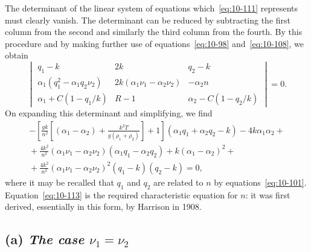 The determinant of the linear system of equations which~\eqref{eq:10-111} represents must clearly vanish. The determinant can be reduced by subtracting the first column from the second and similarly the third column from the fourth. By this procedure and by making further use of equations~\eqref{eq:10-98} and~\eqref{eq:10-108}, we obtain
\begin{equation}
\label{eq:10-112}
\begin{vmatrix}
q_1-k & 2k & q_2-k \\
\alpha_1(q_1^2-\alpha_1q_2\nu_2) & 2k(\alpha_1\nu_1-\alpha_2\nu_2) & -\alpha_2 n \\
\alpha_1+C(1-q_1/k) & R-1 & \alpha_2-C(1-q_2/k)
\end{vmatrix} = 0.
\end{equation}
On expanding this determinant and simplifying, we find
\begin{align}
\label{eq:10-113}
-\left[\frac{gk}{n^2}\!\left[(\alpha_1-\alpha_2)+\frac{k^2T}{g(\rho_1+\rho_2)}\right]+1\right](\alpha_1q_1+\alpha_2q_2-k) - 4k\alpha_1\alpha_2 + {} \nonumber\\
{} + \frac{4k^2}{n^2}(\alpha_1\nu_1-\alpha_2\nu_2)(\alpha_1q_1-\alpha_2q_2)+k(\alpha_1-\alpha_2)^2 + {} \nonumber\\
{} + \frac{4k^2}{n^2}(\alpha_1\nu_1-\alpha_2\nu_2)^2(q_1-k)(q_2-k) = 0,
\end{align}
where it may be recalled that $q_1$ and $q_2$ are related to $n$ by equations~\eqref{eq:10-101}. Equation~\eqref{eq:10-113} is the required characteristic equation for $n$: it was first derived, essentially in this form, by Harrison in 1908.

\subsection*{(a) \textit{The case $\nu_1 = \nu_2$}}

